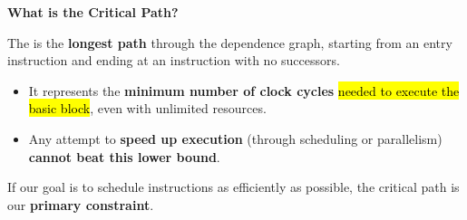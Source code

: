 \begin{flushleft}
    \textcolor{Green3}{ \textbf{What is the Critical Path?}}
\end{flushleft}
The  is the \textbf{longest path} through the dependence graph, starting from an entry instruction and ending at an instruction with no successors.
\begin{itemize}
    \item It represents the \textbf{minimum number of clock cycles} \hl{needed to execute the basic block}, even with unlimited resources.
    \item Any attempt to \textbf{speed up execution} (through scheduling or parallelism) \textbf{cannot beat this lower bound}.
\end{itemize}
If our goal is to schedule instructions as efficiently as possible, the critical path is our \textbf{primary constraint}.